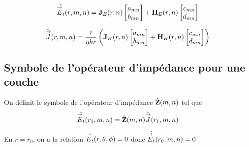         \begin{equation}
            \hat{\vE_t}(r,m,n) = 
            \mJ_{E}(r,n)
            \begin{bmatrix}
                a_{mn}
                \\
                b_{mn}
            \end{bmatrix}
            + 
            \mH_{E}(r,n)
            \begin{bmatrix}
                c_{mn}
                \\
                d_{mn}
            \end{bmatrix}
        \end{equation}

        \begin{equation}
            \hat{\vJ}(r,m,n) = \frac{i}{\eta k r}
            \left(
            \mJ_{H}(r,n)
            \begin{bmatrix}
                a_{mn}
                \\
                b_{mn}
            \end{bmatrix}
            + 
            \mH_{H}(r,n)
            \begin{bmatrix}
                c_{mn}
                \\
                d_{mn}
            \end{bmatrix}
            \right)
        \end{equation}

    \subsection{Symbole de l'opérateur d'impédance pour une couche}

        \begin{figure}[!hbt]
          \centering
          \begin{tikzpicture}
            
          \end{tikzpicture}
        \end{figure}

        \begin{defn}
          On définit le symbole de l'opérateur d'impédance \(\hat{\mZ}(m,n)\) tel que 
          \[
              \hat{\vE_t}(r_1,m,n) = \hat{\mZ}(m,n)\hat{\vJ}(r_1,m,n)
          \]
        \end{defn}

        En \(r=r_0\), on a la relation \(\vE_t(\rtp) = 0\) donc \(\hat{\vE_t}(r_0,m,n) = 0 \)

